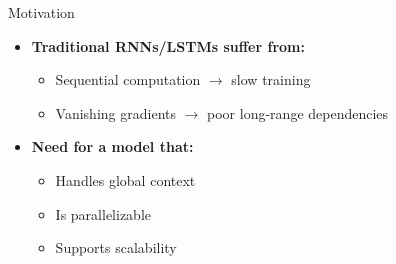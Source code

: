 \begin{frame}{Motivation}
  \begin{itemize}
    \item[$\blacktriangleright$] \textbf{Traditional RNNs/LSTMs suffer from:}
    \begin{itemize}
      \item Sequential computation $\rightarrow$ slow training
      \item Vanishing gradients $\rightarrow$ poor long-range dependencies
    \end{itemize}
    \vspace{0.8em}
    \item[$\blacktriangleright$] \textbf{Need for a model that:}
    \begin{itemize}
      \item Handles global context
      \item Is parallelizable
      \item Supports scalability
    \end{itemize}
  \end{itemize}
\end{frame}

